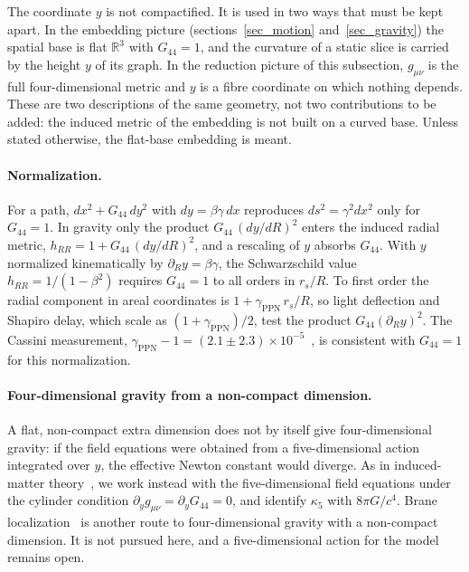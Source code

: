 \documentclass[anonymous]{iopjournal}
\begin{document}
The coordinate $y$ is not compactified. It is used in two ways that must be kept apart. In the embedding picture (sections~\ref{sec_motion} and~\ref{sec_gravity}) the spatial base is flat $\mathbb{R}^3$ with $G_{44}=1$, and the curvature of a static slice is carried by the height $y$ of its graph. In the reduction picture of this subsection, $g_{\mu\nu}$ is the full four-dimensional metric and $y$ is a fibre coordinate on which nothing depends. These are two descriptions of the same geometry, not two contributions to be added: the induced metric of the embedding is not built on a curved base. Unless stated otherwise, the flat-base embedding is meant.

\paragraph{Normalization.} For a path, $dx^2+G_{44}\,dy^2$ with $dy=\beta\gamma\,dx$ reproduces $ds^2=\gamma^2dx^2$ only for $G_{44}=1$. In gravity only the product $G_{44}\,(dy/dR)^2$ enters the induced radial metric, $h_{RR}=1+G_{44}\,(dy/dR)^2$, and a rescaling of $y$ absorbs $G_{44}$. With $y$ normalized kinematically by $\partial_R y=\beta\gamma$, the Schwarzschild value $h_{RR}=1/(1-\beta^2)$ requires $G_{44}=1$ to all orders in $r_s/R$. To first order the radial component in areal coordinates is $1+\gamma_{\mathrm{PPN}}\,r_s/R$, so light deflection and Shapiro delay, which scale as $(1+\gamma_{\mathrm{PPN}})/2$, test the product $G_{44}(\partial_R y)^2$. The Cassini measurement, $\gamma_{\mathrm{PPN}}-1=(2.1\pm2.3)\times10^{-5}$~\cite{Bertotti2003}, is consistent with $G_{44}=1$ for this normalization.

\paragraph{Four-dimensional gravity from a non-compact dimension.} A flat, non-compact extra dimension does not by itself give four-dimensional gravity: if the field equations were obtained from a five-dimensional action integrated over $y$, the effective Newton constant would diverge. As in induced-matter theory~\cite{Wesson1999STM,OverduinWesson1997}, we work instead with the five-dimensional field equations under the cylinder condition $\partial_y g_{\mu\nu}=\partial_y G_{44}=0$, and identify $\kappa_5$ with $8\pi G/c^4$. Brane localization~\cite{RandallSundrum1999} is another route to four-dimensional gravity with a non-compact dimension. It is not pursued here, and a five-dimensional action for the model remains open.
\end{document}
